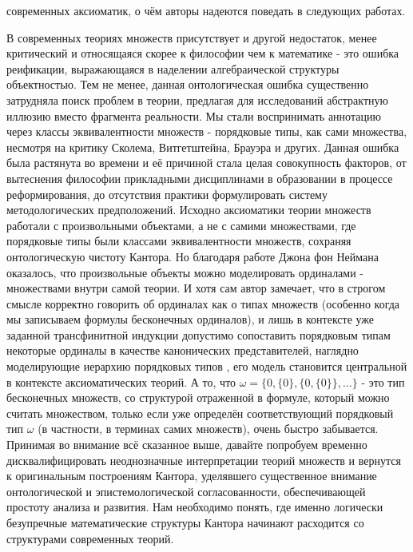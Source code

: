 \documentclass[12pt]{article}
\begin{document}
современных аксиоматик, о чём авторы надеются поведать в следующих работах.

В современных теориях множеств присутствует и другой недостаток, менее критический и относящаяся скорее к философии чем к математике - это ошибка реификации, выражающаяся в наделении алгебраической структуры объектностью. Тем не менее, данная онтологическая ошибка существенно затрудняла поиск проблем в теории, предлагая для исследований абстрактную иллюзию вместо фрагмента реальности. Мы стали воспринимать аннотацию через классы эквивалентности множеств - порядковые типы, как сами множества, несмотря на критику Сколема, Витгетштейна, Брауэра и других. Данная ошибка была растянута во времени и её причиной стала целая совокупность факторов, от вытеснения философии прикладными дисциплинами в образовании в процессе реформирования, до отсутствия практики формулировать систему методологических предположений. Исходно аксиоматики теории множеств работали с произвольными объектами, а не с самими множествами, где порядковые типы были классами эквивалентности множеств, сохраняя онтологическую чистоту Кантора. Но благодаря работе Джона фон Неймана оказалось, что произвольные объекты можно моделировать ординалами - множествами внутри самой теории. И хотя сам автор замечает, что в строгом смысле корректно говорить об ординалах как о типах множеств (особенно когда мы записываем формулы бесконечных ординалов), и лишь в контексте уже заданной трансфинитной индукции допустимо сопоставить порядковым типам некоторые ординалы в качестве канонических представителей, наглядно моделирующие иерархию порядковых типов \cite{von-neumann-ordinals}, его модель становится центральной в контексте аксиоматических теорий. А то, что $\omega = \{ 0, \{ 0 \}, \{ 0, \{ 0 \}\}, \dots \}$ - это тип бесконечных множеств, со структурой отраженной в формуле, который можно считать множеством, только если уже определён соответствующий порядковый тип $\omega$ (в частности, в терминах самих множеств), очень быстро забывается. Принимая во внимание всё сказанное выше, давайте попробуем временно дисквалифицировать неоднозначные интерпретации теорий множеств и вернутся к оригинальным построениям Кантора, уделявшего существенное внимание онтологической и эпистемологической согласованности, обеспечивающей простоту анализа и развития. Нам необходимо понять, где именно логически безупречные математические структуры Кантора начинают расходится со структурами современных теорий.
\end{document}
